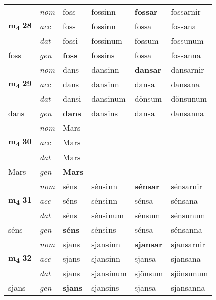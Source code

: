 \begin{longtable}[l]{llllll}
\multirow{3}{*}{{{\textbf{m{\textsubscript{4}}} \Large{\textbf{28}}}}}  & {\footnotesize{{\textit{nom}}}} & foss & fossinn    & \textbf{fossar} & fossarnir  \\*
 &  {\footnotesize{{\textit{acc}}}} & foss  & fossinn   & fossa  & fossana \\*
 &  {\footnotesize{{\textit{dat}}}} & fossi & fossinum   & fossum & fossunum \\*
 {\footnotesize{foss}} &   {\footnotesize{{\textit{gen}}}} & \textbf{foss}  & fossins  & fossa & fossanna \\
\cmidrule{1-6}


\multirow{3}{*}{{{\textbf{m{\textsubscript{4}}} \Large{\textbf{29}}}}}  & {\footnotesize{{\textit{nom}}}} & dans & dansinn    & \textbf{dansar} & dansarnir  \\*
 &  {\footnotesize{{\textit{acc}}}} & dans  & dansinn   & dansa  & dansana \\*
 &  {\footnotesize{{\textit{dat}}}} & dansi & dansinum   & dönsum & dönsunum \\*
 {\footnotesize{dans}} &   {\footnotesize{{\textit{gen}}}} & \textbf{dans}  & dansins  & dansa & dansanna \\
\cmidrule{1-6}


\multirow{3}{*}{{{\textbf{m{\textsubscript{4}}} \Large{\textbf{30}}}}}  & {\footnotesize{{\textit{nom}}}} & Mars &     & \textbf{} &   \\*
 &  {\footnotesize{{\textit{acc}}}} & Mars  &    &   &  \\*
 &  {\footnotesize{{\textit{dat}}}} & Mars &    &  &  \\*
 {\footnotesize{Mars}} &   {\footnotesize{{\textit{gen}}}} & \textbf{Mars}  &   &  &  \\
\cmidrule{1-6}


\multirow{3}{*}{{{\textbf{m{\textsubscript{4}}} \Large{\textbf{31}}}}}  & {\footnotesize{{\textit{nom}}}} & séns & sénsinn    & \textbf{sénsar} & sénsarnir  \\*
 &  {\footnotesize{{\textit{acc}}}} & séns  & sénsinn   & sénsa  & sénsana \\*
 &  {\footnotesize{{\textit{dat}}}} & séns & sénsinum   & sénsum & sénsunum \\*
 {\footnotesize{séns}} &   {\footnotesize{{\textit{gen}}}} & \textbf{séns}  & sénsins  & sénsa & sénsanna \\
\cmidrule{1-6}


\multirow{3}{*}{{{\textbf{m{\textsubscript{4}}} \Large{\textbf{32}}}}}  & {\footnotesize{{\textit{nom}}}} & sjans & sjansinn    & \textbf{sjansar} & sjansarnir  \\*
 &  {\footnotesize{{\textit{acc}}}} & sjans  & sjansinn   & sjansa  & sjansana \\*
 &  {\footnotesize{{\textit{dat}}}} & sjans & sjansinum   & sjönsum & sjönsunum \\*
 {\footnotesize{sjans}} &   {\footnotesize{{\textit{gen}}}} & \textbf{sjans}  & sjansins  & sjansa & sjansanna \\
\cmidrule{1-6}



\end{longtable}
